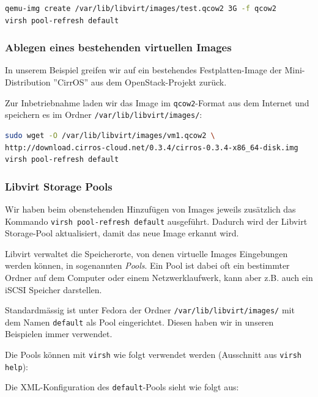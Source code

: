 \begin{lstlisting}[language=bash]
qemu-img create /var/lib/libvirt/images/test.qcow2 3G -f qcow2
virsh pool-refresh default
\end{lstlisting}


\subsubsection{Ablegen eines bestehenden virtuellen Images}

In unserem Beispiel greifen wir auf ein bestehendes Festplatten-Image der Mini-Distribution ''CirrOS'' aus dem OpenStack-Projekt zurück.

Zur Inbetriebnahme laden wir das Image im \lstinline|qcow2|-Format aus dem Internet und speichern es im Ordner \lstinline|/var/lib/libvirt/images/|:

\begin{lstlisting}[language=bash]
sudo wget -O /var/lib/libvirt/images/vm1.qcow2 \
http://download.cirros-cloud.net/0.3.4/cirros-0.3.4-x86_64-disk.img
virsh pool-refresh default
\end{lstlisting}

\subsubsection{Libvirt Storage Pools}

Wir haben beim obenstehenden Hinzufügen von Images jeweils zusätzlich das Kommando \lstinline|virsh pool-refresh default| ausgeführt. Dadurch wird der Libvirt Storage-Pool aktualisiert, damit das neue Image erkannt wird.

Libvirt verwaltet die Speicherorte, von denen virtuelle Images Eingebungen werden können, in sogenannten \emph{Pools}. Ein Pool ist dabei oft ein bestimmter Ordner auf dem Computer oder einem Netzwerklaufwerk, kann aber z.B. auch ein iSCSI Speicher darstellen.

Standardmässig ist unter Fedora der Ordner \lstinline|/var/lib/libvirt/images/| mit dem Namen \lstinline|default| als Pool eingerichtet. Diesen haben wir in unseren Beispielen immer verwendet.

Die Pools können mit \lstinline|virsh| wie folgt verwendet werden (Ausschnitt aus \lstinline|virsh help|):



Die XML-Konfiguration des \lstinline|default|-Pools sieht wie folgt aus:


